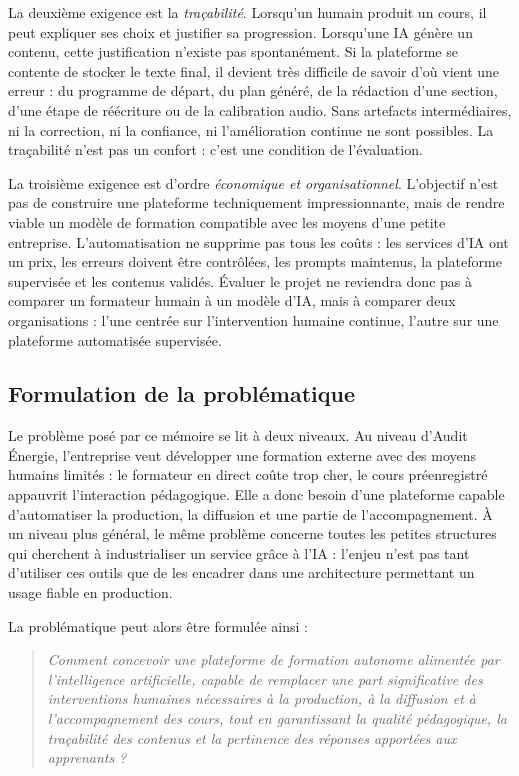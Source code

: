 \documentclass[12pt,a4paper]{article}
\begin{document}
La deuxième exigence est la \emph{traçabilité}. Lorsqu'un humain produit un cours, il
peut expliquer ses choix et justifier sa progression. Lorsqu'une IA génère un contenu, cette
justification n'existe pas spontanément. Si la plateforme se contente de stocker le texte
final, il devient très difficile de savoir d'où vient une erreur : du programme de départ, du
plan généré, de la rédaction d'une section, d'une étape de réécriture ou de la calibration
audio. Sans artefacts intermédiaires, ni la correction, ni la confiance, ni l'amélioration
continue ne sont possibles. La traçabilité n'est pas un confort : c'est une condition de
l'évaluation.

La troisième exigence est d'ordre \emph{économique et organisationnel}. L'objectif n'est
pas de construire une plateforme techniquement impressionnante, mais de rendre viable un
modèle de formation compatible avec les moyens d'une petite entreprise. L'automatisation
ne supprime pas tous les coûts : les services d'IA ont un prix, les erreurs doivent être
contrôlées, les prompts maintenus, la plateforme supervisée et les contenus validés.
Évaluer le projet ne reviendra donc pas à comparer un formateur humain à un modèle
d'IA, mais à comparer deux organisations : l'une centrée sur l'intervention humaine
continue, l'autre sur une plateforme automatisée supervisée.

\subsection{Formulation de la problématique}

Le problème posé par ce mémoire se lit à deux niveaux. Au niveau d'Audit Énergie,
l'entreprise veut développer une formation externe avec des moyens humains limités : le
formateur en direct coûte trop cher, le cours préenregistré appauvrit l'interaction
pédagogique. Elle a donc besoin d'une plateforme capable d'automatiser la production, la
diffusion et une partie de l'accompagnement. À un niveau plus général, le même problème
concerne toutes les petites structures qui cherchent à industrialiser un service grâce à
l'IA : l'enjeu n'est pas tant d'utiliser ces outils que de les encadrer dans une architecture
permettant un usage fiable en production.

La problématique peut alors être formulée ainsi :

\begin{quote}
\emph{Comment concevoir une plateforme de formation autonome alimentée par
l'intelligence artificielle, capable de remplacer une part significative des interventions
humaines nécessaires à la production, à la diffusion et à l'accompagnement des cours,
tout en garantissant la qualité pédagogique, la traçabilité des contenus et la pertinence
des réponses apportées aux apprenants ?}
\end{quote}
\end{document}
